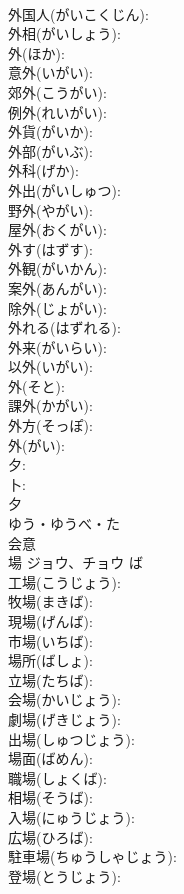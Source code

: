 \documentclass[8pt]{extreport}
\begin{document}
\begin{CJK}{UTF8}{min}
\\	外国人(がいこくじん): 
\\	外相(がいしょう): 
\\	外(ほか): 
\\	意外(いがい): 
\\	郊外(こうがい): 
\\	例外(れいがい): 
\\	外貨(がいか): 
\\	外部(がいぶ): 
\\	外科(げか): 
\\	外出(がいしゅつ): 
\\	野外(やがい): 
\\	屋外(おくがい): 
\\	外す(はずす): 
\\	外観(がいかん): 
\\	案外(あんがい): 
\\	除外(じょがい): 
\\	外れる(はずれる): 
\\	外来(がいらい): 
\\	以外(いがい): 
\\	外(そと): 
\\	課外(かがい): 
\\	外方(そっぽ): 
\\	外(がい): 
\\	夕: 
\\	卜: 
\\	夕	
\\	ゆう・ゆうべ・た	
\\	会意 
\\	場	ジョウ、チョウ	ば		
\\	工場(こうじょう): 
\\	牧場(まきば): 
\\	現場(げんば): 
\\	市場(いちば): 
\\	場所(ばしょ): 
\\	立場(たちば): 
\\	会場(かいじょう): 
\\	劇場(げきじょう): 
\\	出場(しゅつじょう): 
\\	場面(ばめん): 
\\	職場(しょくば): 
\\	相場(そうば): 
\\	入場(にゅうじょう): 
\\	広場(ひろば): 
\\	駐車場(ちゅうしゃじょう): 
\\	登場(とうじょう): 

\end{CJK}
\end{document}
